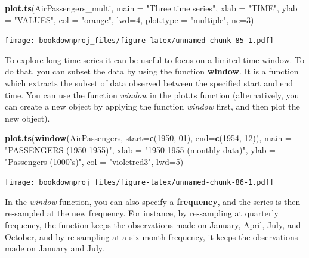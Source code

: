 \documentclass[
]{article}
\newenvironment{Shaded}{\begin{snugshade}}{\end{snugshade}}
\newcommand{\DataTypeTok}[1]{\textcolor[rgb]{0.13,0.29,0.53}{#1}}
\newcommand{\DecValTok}[1]{\textcolor[rgb]{0.00,0.00,0.81}{#1}}
\newcommand{\KeywordTok}[1]{\textcolor[rgb]{0.13,0.29,0.53}{\textbf{#1}}}
\newcommand{\NormalTok}[1]{#1}
\newcommand{\StringTok}[1]{\textcolor[rgb]{0.31,0.60,0.02}{#1}}
\begin{document}
\begin{Shaded}
\begin{Highlighting}[]
\KeywordTok{plot.ts}\NormalTok{(AirPassengers_multi, }
        \DataTypeTok{main =} \StringTok{"Three time series"}\NormalTok{,}
        \DataTypeTok{xlab =} \StringTok{"TIME"}\NormalTok{, }\DataTypeTok{ylab =} \StringTok{"VALUES"}\NormalTok{,}
        \DataTypeTok{col =} \StringTok{"orange"}\NormalTok{,}
        \DataTypeTok{lwd=}\DecValTok{4}\NormalTok{,}
        \DataTypeTok{plot.type =} \StringTok{"multiple"}\NormalTok{,}
        \DataTypeTok{nc=}\DecValTok{3}\NormalTok{)}
\end{Highlighting}
\end{Shaded}

\texttt{[image: bookdownproj\_files/figure-latex/unnamed-chunk-85-1.pdf]}

To explore long time series it can be useful to focus on a limited time window. To do that, you can subset the data by using the function \textbf{window}. It is a function which extracts the subset of data observed between the specified start and end time. You can use the function \emph{window} in the plot.ts function (alternatively, you can create a new object by applying the function \emph{window} first, and then plot the new object).

\begin{Shaded}
\begin{Highlighting}[]
\KeywordTok{plot.ts}\NormalTok{(}\KeywordTok{window}\NormalTok{(AirPassengers, }\DataTypeTok{start=}\KeywordTok{c}\NormalTok{(}\DecValTok{1950}\NormalTok{, }\DecValTok{01}\NormalTok{), }\DataTypeTok{end=}\KeywordTok{c}\NormalTok{(}\DecValTok{1954}\NormalTok{, }\DecValTok{12}\NormalTok{)), }
     \DataTypeTok{main =} \StringTok{"PASSENGERS (1950-1955)"}\NormalTok{,}
     \DataTypeTok{xlab =} \StringTok{"1950-1955 (monthly data)"}\NormalTok{,}
     \DataTypeTok{ylab =} \StringTok{"Passengers (1000's)"}\NormalTok{,}
     \DataTypeTok{col =} \StringTok{"violetred3"}\NormalTok{, }
     \DataTypeTok{lwd=}\DecValTok{5}\NormalTok{)}
\end{Highlighting}
\end{Shaded}

\texttt{[image: bookdownproj\_files/figure-latex/unnamed-chunk-86-1.pdf]}

In the \emph{window} function, you can also specify a \textbf{frequency}, and the series is then re-sampled at the new frequency. For instance, by re-sampling at quarterly frequency, the function keeps the observations made on January, April, July, and October, and by re-sampling at a six-month frequency, it keeps the observations made on January and July.
\end{document}
